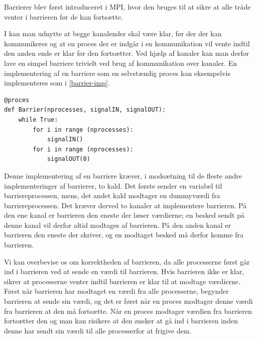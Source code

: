 Barrierer blev først introduceret i MPI, hvor den bruges til at 
sikre at alle tråde venter i barrieren før de kan fortsætte. 

I  kan man udnytte at begge 
kanalender skal være klar, før der der kan kommunikeres og at en proces der er 
indgår i en kommunikation vil vente indtil den anden ende er klar før den 
fortsætter.  Ved hjælp af kanaler kan man derfor lave en simpel barriere 
trivielt ved brug af kommunikation over kanaler.  En implementering af en 
barriere som en selvstændig proces kan eksempelvis implementeres som i 
\cref{barrier-imp}.

\begin{lstlisting}[float, label=barrier-imp,caption=En barriere i \pycsp]
@proces
def Barrier(nprocesses, signalIN, signalOUT):
	while True:
		for i in range (nprocesses):
			signalIN()
		for i in range (nprocesses):
			signalOUT(0)
\end{lstlisting}

Denne implementering af en barriere kræver, i modsætning til de fleste andre implementeringer af barrierer\cites{mpi-barrier, crew}, to kald. Det første sender en variabel til barriereprocessen, mens,
det andet kald modtager en dummyværdi fra barriereprocessen. Det kræver derved 
to kanaler at implementere barrieren. På den ene kanal er barrieren den eneste 
der læser værdierne; en besked sendt på denne kanal vil derfor altid modtages 
af barrieren. På den anden kanal er barrieren den eneste der skriver, og en 
modtaget besked må derfor komme fra barrieren.

Vi kan overbevise os om korrektheden af barrieren, da alle processerne først 
går ind i barrieren ved at sende en værdi til barrieren. Hvis barrieren ikke er 
klar, sikrer \csp at processerne venter indtil barrieren er klar til at modtage 
værdierne. Først når barrieren har modtaget en værdi fra alle processerne, 
begynder barrieren at sende sin værdi, og det er først når en proces modtager 
denne værdi fra barrieren at den må fortsætte. Når en proces modtager værdien 
fra barrieren fortsætter den og man kan risikere at den ønsker at gå ind i 
barrieren inden denne har sendt sin værdi til alle processerfor at frigive dem. 



